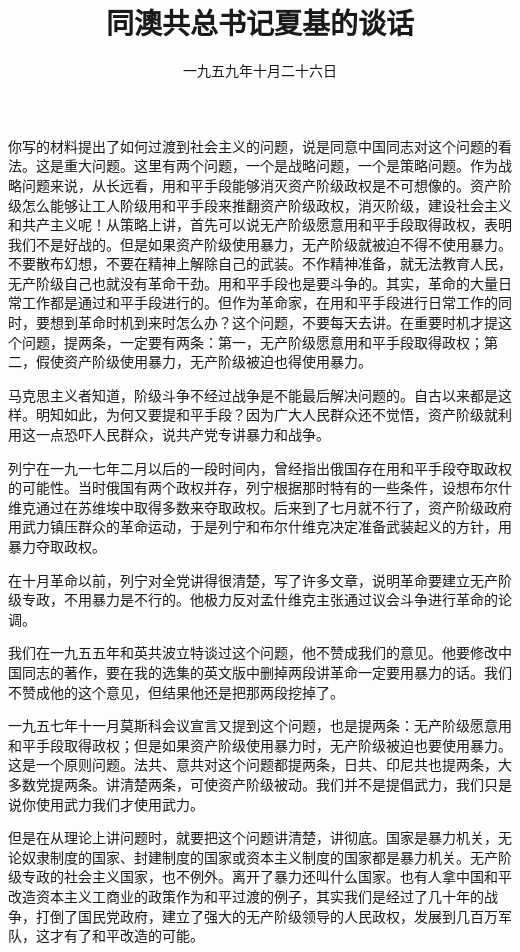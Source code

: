 
\title{同澳共总书记夏基的谈话}
\date{一九五九年十月二十六日}
\maketitle


你写的材料提出了如何过渡到社会主义的问题，说是同意中国同志对这个问题的看法。这是重大问题。这里有两个问题，一个是战略问题，一个是策略问题。作为战略问题来说，从长远看，用和平手段能够消灭资产阶级政权是不可想像的。资产阶级怎么能够让工人阶级用和平手段来推翻资产阶级政权，消灭阶级，建设社会主义和共产主义呢！从策略上讲，首先可以说无产阶级愿意用和平手段取得政权，表明我们不是好战的。但是如果资产阶级使用暴力，无产阶级就被迫不得不使用暴力。不要散布幻想，不要在精神上解除自己的武装。不作精神准备，就无法教育人民，无产阶级自己也就没有革命干劲。用和平手段也是要斗争的。其实，革命的大量日常工作都是通过和平手段进行的。但作为革命家，在用和平手段进行日常工作的同时，要想到革命时机到来时怎么办？这个问题，不要每天去讲。在重要时机才提这个问题，提两条，一定要有两条：第一，无产阶级愿意用和平手段取得政权；第二，假使资产阶级使用暴力，无产阶级被迫也得使用暴力。

马克思主义者知道，阶级斗争不经过战争是不能最后解决问题的。自古以来都是这样。明知如此，为何又要提和平手段？因为广大人民群众还不觉悟，资产阶级就利用这一点恐吓人民群众，说共产党专讲暴力和战争。

列宁在一九一七年二月以后的一段时间内，曾经指出俄国存在用和平手段夺取政权的可能性。当时俄国有两个政权并存，列宁根据那时特有的一些条件，设想布尔什维克通过在苏维埃中取得多数来夺取政权。后来到了七月就不行了，资产阶级政府用武力镇压群众的革命运动，于是列宁和布尔什维克决定准备武装起义的方针，用暴力夺取政权。

在十月革命以前，列宁对全党讲得很清楚，写了许多文章，说明革命要建立无产阶级专政，不用暴力是不行的。他极力反对孟什维克主张通过议会斗争进行革命的论调。

我们在一九五五年和英共波立特谈过这个问题，他不赞成我们的意见。他要修改中国同志的著作，要在我的选集的英文版中删掉两段讲革命一定要用暴力的话。我们不赞成他的这个意见，但结果他还是把那两段挖掉了。

一九五七年十一月莫斯科会议宣言又提到这个问题，也是提两条：无产阶级愿意用和平手段取得政权；但是如果资产阶级使用暴力时，无产阶级被迫也要使用暴力。这是一个原则问题。法共、意共对这个问题都提两条，日共、印尼共也提两条，大多数党提两条。讲清楚两条，可使资产阶级被动。我们并不是提倡武力，我们只是说你使用武力我们才使用武力。

但是在从理论上讲问题时，就要把这个问题讲清楚，讲彻底。国家是暴力机关，无论奴隶制度的国家、封建制度的国家或资本主义制度的国家都是暴力机关。无产阶级专政的社会主义国家，也不例外。离开了暴力还叫什么国家。也有人拿中国和平改造资本主义工商业的政策作为和平过渡的例子，其实我们是经过了几十年的战争，打倒了国民党政府，建立了强大的无产阶级领导的人民政权，发展到几百万军队，这才有了和平改造的可能。

